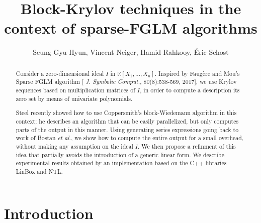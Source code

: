 \documentclass[12pt]{article}
\title{Block-Krylov techniques in the context of sparse-FGLM algorithms}
\author{Seung Gyu Hyun, Vincent Neiger, Hamid Rahkooy, \'Eric Schost}
\def\K{\mathbb{K}}
\def\K {\ensuremath{\mathbb{K}}}
\begin{document}
\maketitle

\begin{abstract}
  Consider a zero-dimensional ideal $I$ in $\K[X_1,\dots,X_n]$.
  Inspired by Faug\`ere and Mou's Sparse FGLM algorithm [{\em
      J. Symbolic Comput.}, 80(8):538-569, 2017], we use Krylov
  sequences based on multiplication matrices of $I$, in order to
  compute a description its zero set by means of univariate
  polynomials.

  Steel recently showed how to use
  Coppersmith's block-Wiedemann algorithm in this context; he
  describes an algorithm that can be easily parallelized, but only
  computes parts of the output in this manner. Using generating series
  expressions going back to work of Bostan {\it et al.}, we show how
  to compute the entire output for a small overhead, without making
  any assumption on the ideal $I$. We then propose a refinment of this
  idea that partially avoids the introduction of a generic linear
  form.  We describe experimental results obtained by an
  implementation based on the C++ libraries LinBox and NTL.
\end{abstract}


\section{Introduction}
\end{document}
